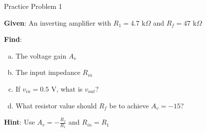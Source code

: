 \documentclass[10pt, aspectratio=169]{beamer}
\newif\ifshowsolutions
\begin{document}
\begin{frame}{Practice Problem 1}
    
    \textbf{Given}:  An inverting amplifier with $R_1 = 4.7$ k$\Omega$ and $R_f = 47$ k$\Omega$
    
    \vspace{0.3cm}
    
    \textbf{Find}:
    \begin{enumerate}[(a)]
        \item The voltage gain $A_v$
        \item The input impedance $R_{in}$
        \item If $v_{in} = 0.5$ V, what is $v_{out}$?
        \item What resistor value should $R_f$ be to achieve $A_v = -15$?
    \end{enumerate}
    
    \vspace{0.5cm}
    
    \textbf{Hint}: Use $A_v = -\frac{R_f}{R_1}$ and $R_{in} = R_1$
    
\end{frame}

\ifshowsolutions
\begin{frame}{Practice Problem 1 Solution}
    
    \textbf{Given}: $R_1 = 4.7$ k$\Omega$, $R_f = 47$ k$\Omega$
    
    \vspace{0.3cm}
    
    \textbf{Solutions}:
    
    (a) Voltage gain: 
    \[
    A_v = -\frac{R_f}{R_1} = -\frac{47\text{ k}\Omega}{4.7\text{ k}\Omega} = \boxed{-10 \text{ V/V}}
    \]
    
    (b) Input impedance:
    \[
    R_{in} = R_1 = \boxed{4.7 \text{ k}\Omega}
    \]
    
    (c) Output voltage: 
    \[
    v_{out} = A_v \cdot v_{in} = (-10)(0.5\text{ V}) = \boxed{-5 \text{ V}}
    \]
    
    (d) For $A_v = -15$: 
    \[
    -15 = -\frac{R_f}{4.7\text{ k}\Omega} \Rightarrow R_f = 15 \times 4.7\text{ k}\Omega = \boxed{70.5 \text{ k}\Omega}
    \]
    
    (Use standard value 68 k$\Omega$ or 75 k$\Omega$ in practice)
    
\end{frame}
\fi
\end{document}
